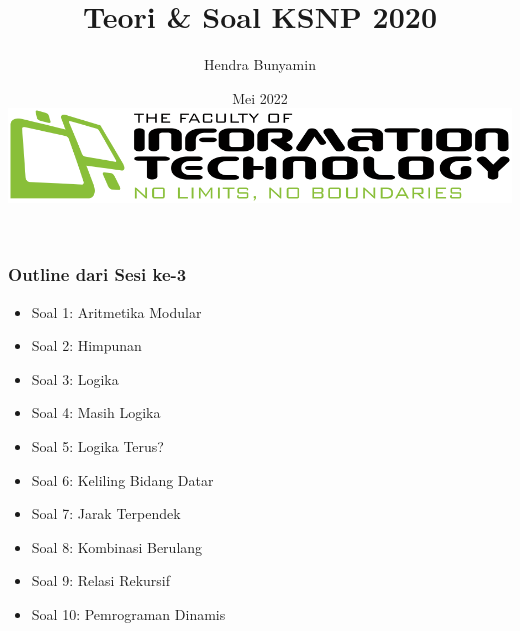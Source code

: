 \documentclass[english,t]{beamer}
\title[]{Teori \& Soal KSNP 2020}
\subtitle{}
\author{Hendra Bunyamin}
\institute[  Maranatha]
{
  Teknik Informatika \\
  Fakultas Teknologi Informasi \\
  Universitas Kristen Maranatha
}
\date[NUNI IT Online] %
{\newline \newline 13 Mei 2022 \\ \bigskip  \bigskip  \bigskip \includegraphics[scale=.3]{images/faculty-it-logo}}
\renewcommand{\emph}[1]{\textcolor{navyblue}{#1}}
\begin{document}
 

\begin{frame}
  \titlepage
\end{frame}



 \begin{frame}

   \frametitle{Outline dari Sesi ke-3}
  \begin{itemize}
\item Soal 1: Aritmetika Modular 
\item Soal 2: Himpunan
\item Soal 3: Logika
\item Soal 4: Masih Logika
\item Soal 5: Logika Terus?
\bigskip
\item Soal 6: Keliling Bidang Datar
\item Soal 7: Jarak Terpendek
\item Soal 8: Kombinasi Berulang
\item Soal 9: Relasi Rekursif
\item Soal 10: Pemrograman Dinamis
\end{itemize}
\end{frame}


%
\end{document}

